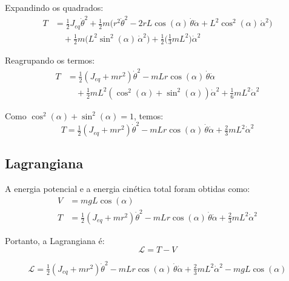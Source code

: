 \documentclass[9pt,a4paper,twocolumn,twoside]{tau-class/tau}
\begin{document}
Expandindo os quadrados:
\begin{align}
    T &= \tfrac{1}{2} J_{eq} \dot{\theta}^2 
        + \tfrac{1}{2} m \big(r^2 \dot{\theta}^2 - 2 r L \cos(\alpha) \, \dot{\theta}\dot{\alpha} + L^2 \cos^2(\alpha) \, \dot{\alpha}^2 \big) \nonumber \\
      &\quad + \tfrac{1}{2} m \big(L^2 \sin^2(\alpha) \, \dot{\alpha}^2\big)
        + \tfrac{1}{2} \Big(\tfrac{1}{3} m L^2\Big) \dot{\alpha}^2
    \label{eq:Ttotal2}
\end{align}

Reagrupando os termos:
\begin{align}
    T &= \tfrac{1}{2}(J_{eq} + m r^2) \dot{\theta}^2 
        - m L r \cos(\alpha) \, \dot{\theta}\dot{\alpha} \nonumber \\
      &\quad + \tfrac{1}{2} m L^2 (\cos^2(\alpha) + \sin^2(\alpha))\dot{\alpha}^2
        + \tfrac{1}{6} m L^2 \dot{\alpha}^2
    \label{eq:Ttotal3}
\end{align}

Como $\cos^2(\alpha) + \sin^2(\alpha) = 1$, temos:
\begin{equation}
    T = \tfrac{1}{2}(J_{eq} + m r^2) \dot{\theta}^2 
        - m L r \cos(\alpha) \, \dot{\theta}\dot{\alpha} 
        + \tfrac{2}{3} m L^2 \dot{\alpha}^2
    \label{eq:TtotalFinal}
\end{equation}


\subsection{Lagrangiana}

A energia potencial e a energia cinética total foram obtidas como:
\begin{align}
    V &= m g L \cos(\alpha) \\
    T &= \tfrac{1}{2}(J_{eq} + m r^2)\dot{\theta}^2 
        - m L r \cos(\alpha)\,\dot{\theta}\dot{\alpha}
        + \tfrac{2}{3} m L^2 \dot{\alpha}^2
\end{align}

Portanto, a Lagrangiana é:
\begin{equation}
    \mathcal{L} = T - V
\end{equation}

\begin{equation}
    \mathcal{L} = \tfrac{1}{2}(J_{eq} + m r^2)\dot{\theta}^2
        - m L r \cos(\alpha)\,\dot{\theta}\dot{\alpha}
        + \tfrac{2}{3} m L^2 \dot{\alpha}^2
        - m g L \cos(\alpha)
\end{equation}
\end{document}
